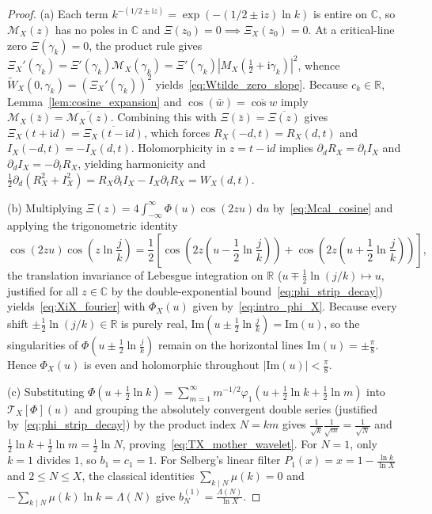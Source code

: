 \documentclass[11pt,reqno]{amsart}
\theoremstyle{definition}
\theoremstyle{remark}
\numberwithin{equation}{section}
\newcommand{\R}{\mathbb{R}}
\newcommand{\C}{\mathbb{C}}
\newcommand{\dd}{\mathrm{d}}
\newcommand{\ii}{\mathrm{i}}
\newcommand{\Ima}{\mathrm{Im}}
\begin{document}
\begin{proof}
(a) Each term $k^{-(1/2 \pm \ii z)} = \exp(-(1/2 \pm \ii z)\ln k)$ is entire on $\C$, so $\mathcal{M}_X(z)$ has no poles in $\C$ and $\Xi(z_0) = 0 \implies \Xi_X(z_0) = 0$. At a critical-line zero $\Xi(\gamma_k) = 0$, the product rule gives $\Xi_X'(\gamma_k) = \Xi'(\gamma_k)\mathcal{M}_X(\gamma_k) = \Xi'(\gamma_k)|M_X(\frac{1}{2}+\ii\gamma_k)|^2$, whence $\widetilde{W}_X(0,\gamma_k) = (\Xi_X'(\gamma_k))^2$ yields~\eqref{eq:Wtilde_zero_slope}. Because $c_k \in \R$, Lemma~\ref{lem:cosine_expansion} and $\cos(\bar{w}) = \overline{\cos w}$ imply $\mathcal{M}_X(\bar{z}) = \overline{\mathcal{M}_X(z)}$. Combining this with $\Xi(\bar{z}) = \overline{\Xi(z)}$ gives $\Xi_X(t + \ii d) = \overline{\Xi_X(t - \ii d)}$, which forces $R_X(-d,t) = R_X(d,t)$ and $I_X(-d,t) = -I_X(d,t)$. Holomorphicity in $z = t - \ii d$ implies $\partial_d R_X = \partial_t I_X$ and $\partial_d I_X = -\partial_t R_X$, yielding harmonicity and $\frac{1}{2}\partial_d(R_X^2 + I_X^2) = R_X\partial_t I_X - I_X\partial_t R_X = W_X(d,t)$.

(b) Multiplying $\Xi(z) = 4\int_{-\infty}^{\infty} \Phi(u)\cos(2zu)\,\dd u$ by~\eqref{eq:Mcal_cosine} and applying the trigonometric identity
\[
\cos(2zu)\cos\!\left(z\ln\frac{j}{k}\right) = \frac{1}{2}\left[\cos\!\left(2z\!\left(u - \frac{1}{2}\ln\frac{j}{k}\right)\right) + \cos\!\left(2z\!\left(u + \frac{1}{2}\ln\frac{j}{k}\right)\right)\right],
\]
the translation invariance of Lebesgue integration on $\R$ ($u \mp \frac{1}{2}\ln(j/k) \mapsto u$, justified for all $z \in \C$ by the double-exponential bound~\eqref{eq:phi_strip_decay}) yields~\eqref{eq:XiX_fourier} with $\Phi_X(u)$ given by~\eqref{eq:intro_phi_X}. Because every shift $\pm\frac{1}{2}\ln(j/k) \in \R$ is purely real, $\Ima(u \pm \frac{1}{2}\ln\frac{j}{k}) = \Ima(u)$, so the singularities of $\Phi(u \pm \frac{1}{2}\ln\frac{j}{k})$ remain on the horizontal lines $\Ima(u) = \pm\frac{\pi}{8}$. Hence $\Phi_X(u)$ is even and holomorphic throughout $|\Ima(u)| < \frac{\pi}{8}$.

(c) Substituting $\Phi(u + \frac{1}{2}\ln k) = \sum_{m=1}^{\infty} m^{-1/2}\varphi_1(u + \frac{1}{2}\ln k + \frac{1}{2}\ln m)$ into $\mathcal{T}_X[\Phi](u)$ and grouping the absolutely convergent double series (justified by~\eqref{eq:phi_strip_decay}) by the product index $N = km$ gives $\frac{1}{\sqrt{k}}\frac{1}{\sqrt{m}} = \frac{1}{\sqrt{N}}$ and $\frac{1}{2}\ln k + \frac{1}{2}\ln m = \frac{1}{2}\ln N$, proving~\eqref{eq:TX_mother_wavelet}. For $N = 1$, only $k = 1$ divides $1$, so $b_1 = c_1 = 1$. For Selberg's linear filter $P_1(x) = x = 1 - \frac{\ln k}{\ln X}$ and $2 \le N \le X$, the classical identities $\sum_{k \mid N} \mu(k) = 0$ and $-\sum_{k \mid N} \mu(k)\ln k = \Lambda(N)$ give $b_N^{(1)} = \frac{\Lambda(N)}{\ln X}$.
\end{proof}
\end{document}

